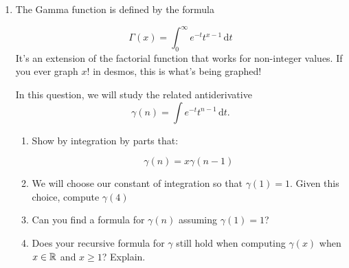 \begin{enumerate}
    \newpage
    \item The Gamma function is defined by the formula 

    \[
        \Gamma(x) = \int_0^\infty e^{-t}t^{x-1}\,\mathrm dt
    \]
    It's an extension of the factorial function that works for non-integer values. If you ever graph $x!$ in desmos, this is what's being graphed!

    In this question, we will study the related antiderivative
    \[
        \gamma(n) = \int e^{-t}t^{n-1}\,\mathrm dt.
    \]
    
    \begin{enumerate}
    
        \item Show by integration by parts that:

        \[
            \gamma(n) = x\gamma(n-1)
        \]
        \item We will choose our constant of integration so that $\gamma(1)=1$.
        Given this choice, compute $\gamma(4)$
        \item Can you find a formula for $\gamma(n)$ assuming $\gamma(1)=1$?
        \item Does your recursive formula for $\gamma$ still hold
        when computing $\gamma(x)$ when $x\in \mathbb{R}$ and $x\geq 1$? Explain.
    \end{enumerate}    
\end{enumerate}

















